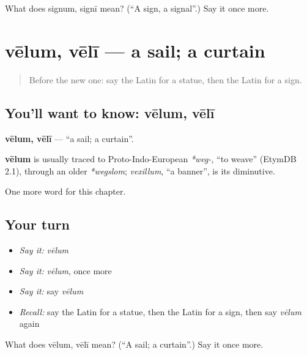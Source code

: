 \begin{tcolorbox}[breakable,colback=teal!4,colframe=teal!35!black,title={Before you move on}]
What does signum, signī mean? (\textquotedblleft{}A sign, a signal\textquotedblright{}.) Say it once more.
\end{tcolorbox}
\section[vēlum, vēlī]{vēlum, vēlī — a sail; a curtain}

\label{lesson:LA-C125-velum}



\begin{quote}
Before the new one: say the Latin for a statue, then the Latin for a sign.
\end{quote}

\subsection*{You'll want to know: vēlum, vēlī}
\textbf{vēlum, vēlī} — \textquotedblleft{}a sail; a curtain\textquotedblright{}.

\begin{cousinweb}
\textbf{vēlum} is usually traced to Proto-Indo-European \emph{*weg-}, \textquotedblleft{}to weave\textquotedblright{} (EtymDB 2.1), through an older \emph{*wegslom}; \emph{vexillum}, \textquotedblleft{}a banner\textquotedblright{}, is its diminutive.
\end{cousinweb}

\begin{grammarlens}[title={What you've built}]
One more word for this chapter.
\end{grammarlens}

\subsection*{Your turn}
\begin{itemize}
\raggedright
  \item \emph{Say it:} \emph{vēlum}
  \item \emph{Say it:} \emph{vēlum}, once more
  \item \emph{Say it:} say \emph{vēlum}
  \item \emph{Recall:} say the Latin for a statue, then the Latin for a sign, then say \emph{vēlum} again
\end{itemize}

\begin{tcolorbox}[breakable,colback=teal!4,colframe=teal!35!black,title={Before you move on}]
What does vēlum, vēlī mean? (\textquotedblleft{}A sail; a curtain\textquotedblright{}.) Say it once more.
\end{tcolorbox}
